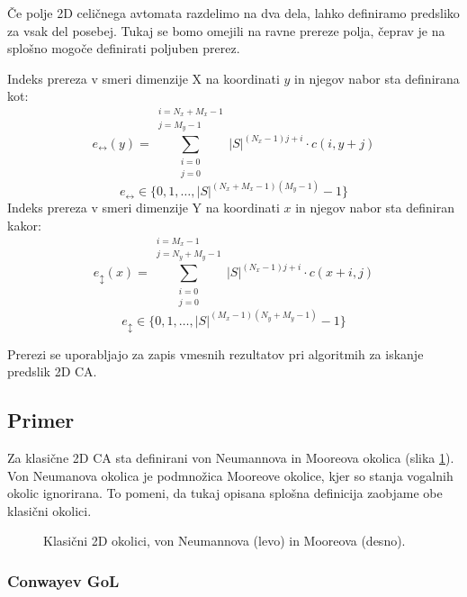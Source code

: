 \documentclass[12pt,a4paper,openany,twoside]{book}
\begin{document}
Če polje 2D celičnega avtomata razdelimo na dva dela,
lahko definiramo predsliko za vsak del posebej.
Tukaj se bomo omejili na ravne prereze polja,
čeprav je na splošno mogoče definirati poljuben prerez.

Indeks prereza v smeri dimenzije X na koordinati \(y\) in njegov nabor sta definirana kot:
\begin{equation}
e_{\leftrightarrow}(y) = \sum_{\substack{i=0 \\ j=0}}^{\substack{i=N_x+M_x-1 \\ j=M_y-1}} |S|^{(N_x-1) j + i} \cdot c(i,y+j)
\end{equation}
\begin{equation}
e_{\leftrightarrow} \in \{0, 1, \ldots, |S|^{(N_x+M_x-1)(M_y-1)}-1\}
\end{equation}
Indeks prereza v smeri dimenzije Y na koordinati \(x\) in njegov nabor sta definiran kakor:
\begin{equation}
e_{\updownarrow}(x) = \sum_{\substack{i=0 \\ j=0}}^{\substack{i=M_x-1 \\ j=N_y+M_y-1}} |S|^{(N_x-1) j + i} \cdot c(x+i,j)
\end{equation}
\begin{equation}
e_{\updownarrow} \in \{0, 1, \ldots, |S|^{(M_x-1)(N_y+M_y-1)}-1\}
\end{equation}

Prerezi se uporabljajo za zapis vmesnih rezultatov pri algoritmih za iskanje predslik 2D CA.

\subsection{Primer}

Za klasične 2D CA sta definirani von Neumannova in Mooreova okolica (slika \ref{neighborhood_classic}).
Von Neumanova okolica je podmnožica Mooreove okolice, kjer so stanja vogalnih okolic ignorirana.
To pomeni, da tukaj opisana splošna definicija zaobjame obe klasični okolici.

\vspace{5mm}
\begin{figure}[htb]
\centerline{}
\caption[Klasične 2D okolice.]
{Klasični 2D okolici, von Neumannova (levo) in Mooreova (desno).}
\label{neighborhood_classic}
\end{figure}

\subsubsection{Conwayev GoL}
\end{document}
